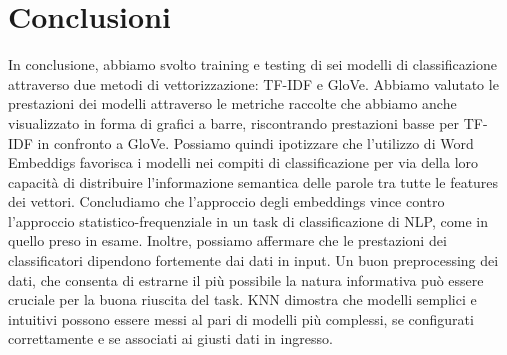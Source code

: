 \documentclass[12pt, a4paper, twoside]{article}
\numberwithin{table}{section}
\begin{document}
    \thispagestyle{plain}
    \section{Conclusioni}

    In conclusione, abbiamo svolto training e testing di sei modelli di classificazione attraverso due metodi di vettorizzazione: TF-IDF e GloVe. Abbiamo valutato le prestazioni dei modelli attraverso le metriche raccolte che abbiamo anche visualizzato in forma di grafici a barre, riscontrando prestazioni basse per TF-IDF in confronto a GloVe. Possiamo quindi ipotizzare che l'utilizzo di Word Embeddigs favorisca i modelli nei compiti di classificazione per via della loro capacità di distribuire l'informazione semantica delle parole tra tutte le features dei vettori. Concludiamo che l'approccio degli embeddings vince contro l'approccio statistico-frequenziale in un task di classificazione di NLP, come in quello preso in esame. Inoltre, possiamo affermare che le prestazioni dei classificatori dipendono fortemente dai dati in input. Un buon preprocessing dei dati, che consenta di estrarne il più possibile la natura informativa può essere cruciale per la buona riuscita del task. KNN dimostra che modelli semplici e intuitivi possono essere messi al pari di modelli più complessi, se configurati correttamente e se associati ai giusti dati in ingresso.

     
\end{document}
